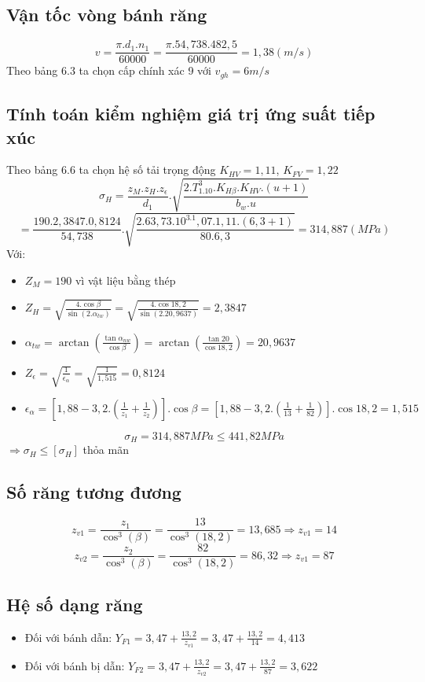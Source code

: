 \subsection{Vận tốc vòng bánh răng}
\[
    v = \frac{\pi.d_1.n_1}{60000} = \frac{\pi.54,738.482,5}{60000} = 1,38 (m/s)
\]
Theo bảng 6.3 ta chọn cấp chính xác 9 với $v_{gh} = 6 m/s$
\subsection{Tính toán kiểm nghiệm giá trị ứng suất tiếp xúc}
Theo bảng 6.6 ta chọn hệ số tải trọng động $K_{HV} = 1,11$, $K_{FV} = 1,22$ \\
\[
    \sigma_H = \frac{z_M.z_H.z_\epsilon}{d_1}.\sqrt{\frac{2.T_1.10^3.K_{H\beta}.K_{HV}.(u+1)}{b_w.u}} 
\]
\[
    = \frac{190.2,3847.0,8124}{54,738}.\sqrt{\frac{2.63,73.10^3.1,07.1,11.(6,3+1)}{80.6,3}} = 314,887 (MPa)
\]
Với:
\begin{itemize}
    \item $Z_M = 190$ vì vật liệu bằng thép
    \item $Z_H = \sqrt{\frac{4.\cos\beta}{\sin(2.\alpha_{tw})}} = \sqrt{\frac{4.\cos18,2}{\sin(2.20,9637)}} = 2,3847$
    \item $\alpha_{tw} = \arctan(\frac{\tan\alpha_{nw}}{\cos\beta}) = \arctan(\frac{\tan20}{\cos18,2}) = 20,9637$
    \item $Z_\epsilon = \sqrt{\frac{1}{\epsilon_\alpha}} = \sqrt{\frac{1}{1,515}} = 0,8124$
    \item $\epsilon_\alpha = [1,88-3,2.(\frac{1}{z_1}+\frac{1}{z_2})].\cos\beta = [1,88-3,2.(\frac{1}{13}+\frac{1}{82})].\cos18,2 = 1,515$
\end{itemize}
\[
    \sigma_H = 314,887 MPa \leq 441,82 MPa
\]
    $\Rightarrow \sigma_H \leq [\sigma_H]$ thỏa mãn\\
\subsection{Số răng tương đương}
\[
    z_{v1} = \frac{z_1}{\cos^3(\beta)} = \frac{13}{\cos^3(18,2)} = 13,685 \Rightarrow z_{v1} = 14
\]
\[
    z_{v2} = \frac{z_2}{\cos^3(\beta)} = \frac{82}{\cos^3(18,2)} = 86,32 \Rightarrow z_{v1} = 87
\]
\subsection{Hệ số dạng răng}
\begin{itemize}
    \item Đối với bánh dẫn: $Y_{F1} = 3,47 + \frac{13,2}{z_{v1}} = 3,47 + \frac{13,2}{14} = 4,413$
    \item Đối với bánh bị dẫn: $Y_{F2} = 3,47 + \frac{13,2}{z_{v2}} = 3,47 + \frac{13,2}{87} = 3,622$
\end{itemize}
